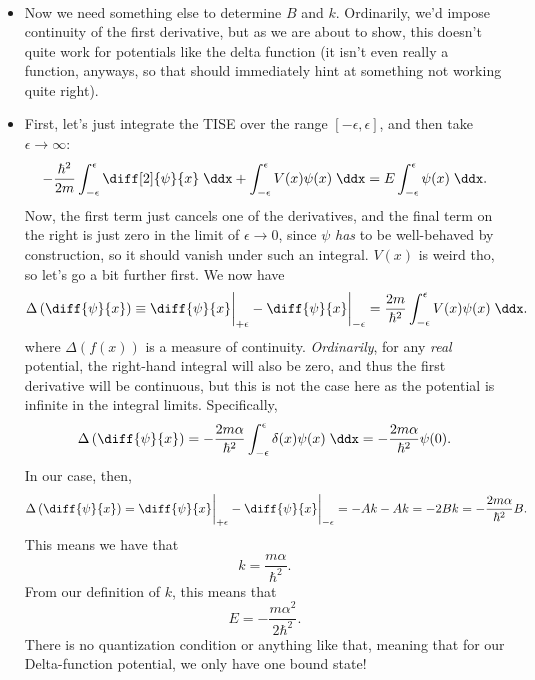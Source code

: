 \begin{itemize}
\begin{equation*}
\begin{alignedat}{1}
            \end{alignedat}
        \end{equation*}
    \item Now we need something else to determine $B$ and $k$. Ordinarily, we'd impose continuity of the first derivative, but as we are about to show, this doesn't quite work for potentials like the delta function (it isn't even really a function, anyways, so that should immediately hint at something not working quite right).
    \item First, let's just integrate the TISE over the range $[-\epsilon,\epsilon]$, and then take $\epsilon \rightarrow \infty$:
        \begin{equation*}
            -\frac{\hbar^2}{2m} \int_{-\epsilon}^{\epsilon} \diff[2]{\psi}{x} \;\ddx + \int_{-\epsilon}^{\epsilon} V(x)\psi(x) \;\ddx = E \int_{-\epsilon}^{\epsilon} \psi(x) \;\ddx.
        \end{equation*}
        Now, the first term just cancels one of the derivatives, and the final term on the right is just zero in the limit of $\epsilon \rightarrow 0$, since $\psi$ \textit{has} to be well-behaved by construction, so it should vanish under such an integral. $V(x)$ is weird tho, so let's go a bit further first. We now have
        \begin{equation*}
            \Delta\left( \diff{\psi}{x} \right) \equiv \diff{\psi}{x}\bigg|_{+\epsilon} - \diff{\psi}{x}\bigg|_{-\epsilon} = \frac{2m}{\hbar^2} \int_{-\epsilon}^{\epsilon} V(x)\psi(x)\;\ddx.
        \end{equation*}
        where $\Delta(f(x))$ is a measure of continuity. \textit{Ordinarily}, for any \textit{real} potential, the right-hand integral will also be zero, and thus the first derivative will be continuous, but this is not the case here as the potential is infinite in the integral limits. Specifically,
        \begin{equation*}
            \Delta\left( \diff{\psi}{x} \right) = -\frac{2m\alpha}{\hbar^2} \int_{-\epsilon}^{\epsilon} \delta(x)\psi(x)\;\ddx = -\frac{2m\alpha}{\hbar^2} \psi(0).
        \end{equation*}
        In our case, then,
        \begin{equation*}
            \Delta\left( \diff{\psi}{x} \right) = \diff{\psi}{x}\bigg|_{+\epsilon} - \diff{\psi}{x}\bigg|_{-\epsilon} = -Ak - Ak = -2Bk = -\frac{2m\alpha}{\hbar^2}B.
        \end{equation*}
        This means we have that
        \begin{equation*}
            k = \frac{m\alpha}{\hbar^2}.
        \end{equation*}
        From our definition of $k$, this means that
        \begin{equation*}
            E = -\frac{m\alpha^2}{2\hbar^2}.
        \end{equation*}
        There is no quantization condition or anything like that, meaning that for our Delta-function potential, we only have one bound state!
\end{itemize}

